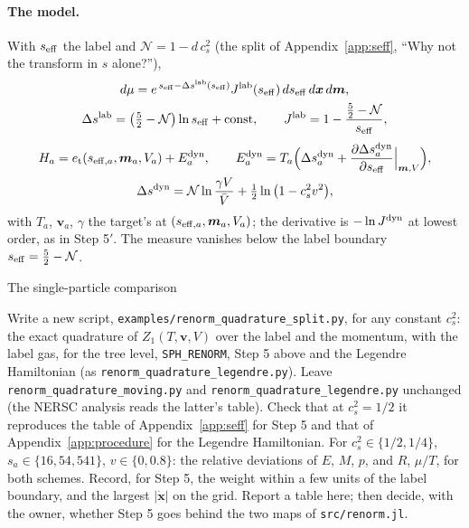 \documentclass[11pt,aps,preprint,nofootinbib,superscriptaddress,tightenlines]{revtex4-2}
\def\st{\begin{equation}}
\def\stp{\end{equation}}
\def\App#1{Appendix~\ref{#1}}
\let\oldparagraph\paragraph
\renewcommand{\paragraph}{\par\bigskip\oldparagraph}
\begin{document}
\paragraph{The model.}  With $s_{\rm eff}$ the label and $\mathcal N=1-d\,c_s^2$ (the split of \App{app:seff}, ``Why not the transform in $s$ alone?''),
\st
\begin{gathered}
d\mu=e^{\,s_{\rm eff}-\Delta s^{\rm lab}(s_{\rm eff})}J^{\rm lab}(s_{\rm eff})\,ds_{\rm eff}\,d\bm x\,d\bm m,\\
\Delta s^{\rm lab}=\big(\tfrac52-\mathcal N\big)\ln s_{\rm eff}+{\rm const},\qquad J^{\rm lab}=1-\frac{\tfrac52-\mathcal N}{s_{\rm eff}},
\end{gathered}
\stp
\st
\begin{gathered}
H_a=e_{\rm t}(s_{{\rm eff},a},\bm m_a,V_a)+E^{\rm dyn}_a,\qquad
E^{\rm dyn}_a=T_a\Big(\Delta s^{\rm dyn}_a+\frac{\partial\Delta s^{\rm dyn}_a}{\partial s_{\rm eff}}\Big|_{\bm m,V}\Big),\\
\Delta s^{\rm dyn}=\mathcal N\ln\frac{\gamma V}{\bar V}+\tfrac12\ln\big(1-c_s^2v^2\big),
\end{gathered}
\stp
with $T_a$, $\bm v_a$, $\gamma$ the target's at $(s_{{\rm eff},a},\bm m_a,V_a)$; the derivative is $-\ln J^{\rm dyn}$ at lowest order, as in Step 5$'$.  The measure vanishes below the label boundary $s_{\rm eff}=\tfrac52-\mathcal N$.

\begin{algobox}{The single-particle comparison}
\begin{algorithmic}[1]
\State Write a new script, \texttt{examples/renorm\_quadrature\_split.py}, for any constant $c_s^2$: the exact quadrature of $Z_1(T,\bm v,V)$ over the label and
  the momentum, with the label gas, for the tree level, \texttt{SPH\_RENORM}, Step 5 above and the Legendre Hamiltonian (as \texttt{renorm\_quadrature\_legendre.py}).
\State Leave \texttt{renorm\_quadrature\_moving.py} and \texttt{renorm\_quadrature\_legendre.py} unchanged (the NERSC analysis reads the latter's table).
\State Check that at $c_s^2=1/2$ it reproduces the table of \App{app:seff} for Step 5 and that of \App{app:procedure} for the Legendre Hamiltonian.
\State For $c_s^2\in\{1/2,1/4\}$, $s_a\in\{16,54,541\}$, $v\in\{0,0.8\}$: the relative deviations of $E$, $M$, $p$, and $R$, $\mu/T$, for both schemes.
\State Record, for Step 5, the weight within a few units of the label boundary, and the largest $|\dot{\bm x}|$ on the grid.
\State Report a table here; then decide, with the owner, whether Step 5 goes behind the two maps of \nolinkurl{src/renorm.jl}.
\end{algorithmic}
\end{algobox}
\end{document}
